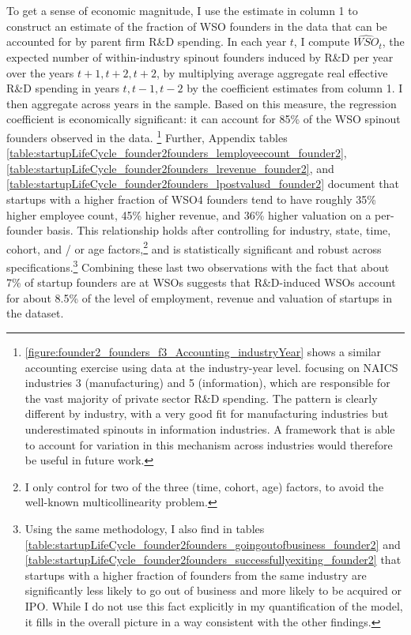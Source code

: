 \documentclass[ecta,nameyear,final]{econsocart}
\theoremstyle{plain}
\theoremstyle{remark}
\begin{document}
To get a sense of economic magnitude, I use the estimate in column 1 to construct an estimate of the fraction of WSO founders in the data that can be accounted for by parent firm R\&D spending. In each year $t$, I compute $\hat{WSO}_{t}$, the expected number of within-industry spinout founders induced by R\&D per year over the years $t+1,t+2,t+2$, by multiplying average aggregate real effective R\&D spending in years $t,t-1,t-2$ by the coefficient estimates from column 1. I then aggregate across years in the sample. Based on this measure, the regression coefficient is economically significant: it can account for 85\% of the WSO spinout founders observed in the data. \footnote{\autoref{figure:founder2_founders_f3_Accounting_industryYear} shows a similar accounting exercise using data at the industry-year level. focusing on NAICS industries 3 (manufacturing) and 5 (information), which are responsible for the vast majority of private sector R\&D spending. The pattern is clearly different by industry, with a very good fit for manufacturing industries but underestimated spinouts in information industries. A framework that is able to account for variation in this mechanism across industries would therefore be useful in future work.} Further, Appendix tables \ref{table:startupLifeCycle_founder2founders_lemployeecount_founder2}, \ref{table:startupLifeCycle_founder2founders_lrevenue_founder2}, and \ref{table:startupLifeCycle_founder2founders_lpostvalusd_founder2} document that startups with a higher fraction of WSO4 founders tend to have roughly 35\% higher employee count, 45\% higher revenue, and 36\% higher valuation on a per-founder basis. This relationship holds after controlling for industry, state, time, cohort, and / or age factors,\footnote{I only control for two of the three (time, cohort, age) factors, to avoid the well-known multicollinearity problem.} and is statistically significant and robust across specifications.\footnote{Using the same methodology, I also find in tables \ref{table:startupLifeCycle_founder2founders_goingoutofbusiness_founder2} and \ref{table:startupLifeCycle_founder2founders_successfullyexiting_founder2} that startups with a higher fraction of founders from the same industry are significantly less likely to go out of business and more likely to be acquired or IPO. While I do not use this fact explicitly in my quantification of the model, it fills in the overall picture in a way consistent with the other findings.} Combining these last two observations with the fact that about 7\% of startup founders are at WSOs suggests that R\&D-induced WSOs account for about 8.5\% of the level of employment, revenue and valuation of startups in the dataset.
\end{document}
